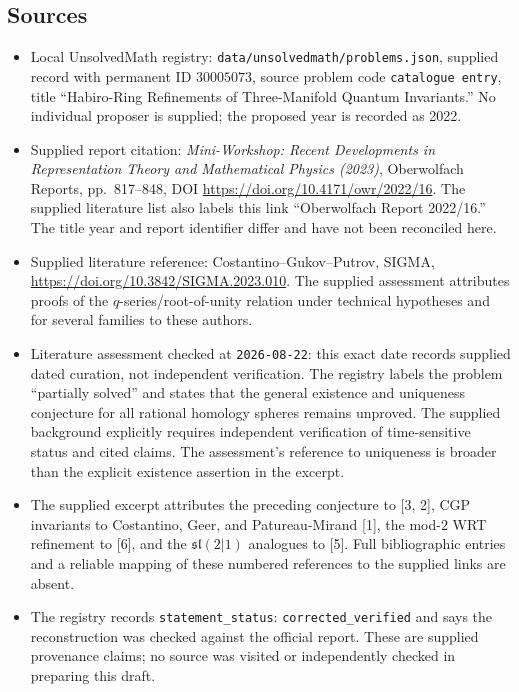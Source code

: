 \documentclass[11pt]{article}
\begin{document}
\subsection{Sources}
\begin{itemize}
\item Local UnsolvedMath registry: \texttt{data/unsolvedmath/problems.json}, supplied record with permanent ID \(30005073\), source problem code \texttt{catalogue entry}, title ``Habiro-Ring Refinements of Three-Manifold Quantum Invariants.'' No individual proposer is supplied; the proposed year is recorded as 2022.
\item Supplied report citation: \emph{Mini-Workshop: Recent Developments in Representation Theory and Mathematical Physics (2023)}, Oberwolfach Reports, pp.~817--848, DOI \url{https://doi.org/10.4171/owr/2022/16}. The supplied literature list also labels this link ``Oberwolfach Report 2022/16.'' The title year and report identifier differ and have not been reconciled here.
\item Supplied literature reference: Costantino--Gukov--Putrov, SIGMA, \url{https://doi.org/10.3842/SIGMA.2023.010}. The supplied assessment attributes proofs of the \(q\)-series/root-of-unity relation under technical hypotheses and for several families to these authors.
\item Literature assessment checked at \texttt{2026-08-22}: this exact date records supplied dated curation, not independent verification. The registry labels the problem ``partially solved'' and states that the general existence and uniqueness conjecture for all rational homology spheres remains unproved. The supplied background explicitly requires independent verification of time-sensitive status and cited claims. The assessment's reference to uniqueness is broader than the explicit existence assertion in the excerpt.
\item The supplied excerpt attributes the preceding conjecture to [3, 2], CGP invariants to Costantino, Geer, and Patureau-Mirand [1], the mod-\(2\) WRT refinement to [6], and the \(\mathfrak{sl}(2|1)\) analogues to [5]. Full bibliographic entries and a reliable mapping of these numbered references to the supplied links are absent.
\item The registry records \texttt{statement\_status}: \texttt{corrected\_verified} and says the reconstruction was checked against the official report. These are supplied provenance claims; no source was visited or independently checked in preparing this draft.
\end{itemize}
\end{document}
